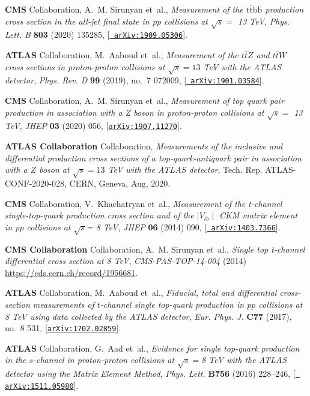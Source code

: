 \documentclass[11pt,a4paper]{article}
\numberwithin{equation}{section}
\numberwithin{figure}{section}
\numberwithin{table}{section}
\begin{document}
\begin{thebibliography}{100}
{\bf CMS} Collaboration, A.~M. Sirunyan et~al., {\it {Measurement of the
  $\mathrm{t\bar{t}}\mathrm{b\bar{b}}$ production cross section in the all-jet
  final state in pp collisions at $\sqrt{s} =$ 13 TeV}},  {\em Phys. Lett. B}
  {\bf 803} (2020) 135285, [\href{http://arxiv.org/abs/1909.05306}{{\tt
  arXiv:1909.05306}}].

{\bf ATLAS} Collaboration, M.~Aaboud et~al., {\it {Measurement of the
  $t\bar{t}Z$ and $t\bar{t}W$ cross sections in proton-proton collisions at
  $\sqrt{s}=13$ TeV with the ATLAS detector}},  {\em Phys. Rev. D} {\bf 99}
  (2019), no.~7 072009, [\href{http://arxiv.org/abs/1901.03584}{{\tt
  arXiv:1901.03584}}].

{\bf CMS} Collaboration, A.~M. Sirunyan et~al., {\it {Measurement of top quark
  pair production in association with a Z boson in proton-proton collisions at
  $\sqrt{s}=$ 13 TeV}},  {\em JHEP} {\bf 03} (2020) 056,
  [\href{http://arxiv.org/abs/1907.11270}{{\tt arXiv:1907.11270}}].

{\bf ATLAS Collaboration} Collaboration, {\it {Measurements of the inclusive
  and differential production cross sections of a top-quark-antiquark pair in
  association with a $Z$ boson at $\sqrt{s} = 13$ TeV with the ATLAS
  detector}},  Tech. Rep. ATLAS-CONF-2020-028, CERN, Geneva, Aug, 2020.

{\bf CMS} Collaboration, V.~Khachatryan et~al., {\it {Measurement of the
  t-channel single-top-quark production cross section and of the $\mid V_{tb}
  \mid$ CKM matrix element in pp collisions at $\sqrt{s}$= 8 TeV}},  {\em JHEP}
  {\bf 06} (2014) 090, [\href{http://arxiv.org/abs/1403.7366}{{\tt
  arXiv:1403.7366}}].

{\bf CMS Collaboration} Collaboration, A.~M. Sirunyan et~al., {\it {Single top
  t-channel differential cross section at 8 TeV}},  {\em CMS-PAS-TOP-14-004}
  (2014) \url{https://cds.cern.ch/record/1956681}.

{\bf ATLAS} Collaboration, M.~Aaboud et~al., {\it {Fiducial, total and
  differential cross-section measurements of $t$-channel single top-quark
  production in $pp$ collisions at 8 TeV using data collected by the ATLAS
  detector}},  {\em Eur. Phys. J.} {\bf C77} (2017), no.~8 531,
  [\href{http://arxiv.org/abs/1702.02859}{{\tt arXiv:1702.02859}}].

{\bf ATLAS} Collaboration, G.~Aad et~al., {\it {Evidence for single top-quark
  production in the $s$-channel in proton-proton collisions at $\sqrt{s}=$8 TeV
  with the ATLAS detector using the Matrix Element Method}},  {\em Phys. Lett.}
  {\bf B756} (2016) 228--246, [\href{http://arxiv.org/abs/1511.05980}{{\tt
  arXiv:1511.05980}}].


\end{thebibliography}
\end{document}

